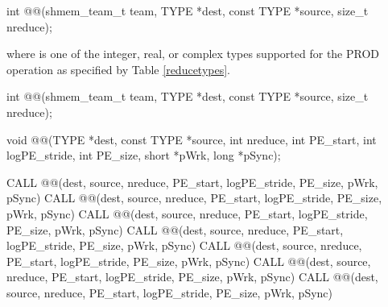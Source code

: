 \begin{apidefinition}
{\color{Green}
\begin{C11synopsis}
int @@(shmem_team_t team, TYPE *dest, const TYPE *source, size_t nreduce);
\end{C11synopsis}
where \TYPE{} is one of the integer, real, or complex types supported for the PROD operation as specified by Table \ref{reducetypes}.
}

\begin{Csynopsis}
\end{Csynopsis}
{\color{Green}
\begin{CsynopsisCol}
int @@(shmem_team_t team, TYPE *dest, const TYPE *source, size_t nreduce);
\end{CsynopsisCol}
}
\begin{DeprecateBlock}
\begin{CsynopsisCol}
void @@(TYPE *dest, const TYPE *source, int nreduce, int PE_start, int logPE_stride, int PE_size, short *pWrk, long *pSync);
\end{CsynopsisCol}
\end{DeprecateBlock}

\begin{Fsynopsis}
CALL @@(dest, source, nreduce, PE_start, logPE_stride, PE_size, pWrk, pSync)
CALL @@(dest, source, nreduce, PE_start, logPE_stride, PE_size, pWrk, pSync)
CALL @@(dest, source, nreduce, PE_start, logPE_stride, PE_size, pWrk, pSync)
CALL @@(dest, source, nreduce, PE_start, logPE_stride, PE_size, pWrk, pSync)
CALL @@(dest, source, nreduce, PE_start, logPE_stride, PE_size, pWrk, pSync)
CALL @@(dest, source, nreduce, PE_start, logPE_stride, PE_size, pWrk, pSync)
CALL @@(dest, source, nreduce, PE_start, logPE_stride, PE_size, pWrk, pSync)
\end{Fsynopsis}



\begin{apiarguments}



\end{apiarguments}
\end{apidefinition}
